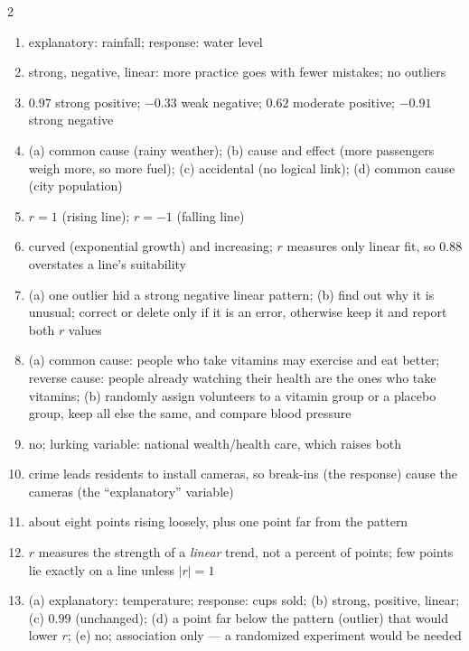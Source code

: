 \documentclass[11pt]{article}
\begin{document}
\begin{keybox}
\begin{multicols}{2}
\small
\begin{enumerate}[leftmargin=*,itemsep=3pt]
  \item explanatory: rainfall; response: water level
  \item strong, negative, linear: more practice goes with fewer mistakes; no outliers
  \item $0.97$ strong positive; $-0.33$ weak negative; $0.62$ moderate positive; $-0.91$ strong negative
  \item (a) common cause (rainy weather); (b) cause and effect (more passengers weigh more, so more fuel); (c) accidental (no logical link); (d) common cause (city population)
  \item $r=1$ (rising line); $r=-1$ (falling line)
  \item curved (exponential growth) and increasing; $r$ measures only linear fit, so $0.88$ overstates a line's suitability
  \item (a) one outlier hid a strong negative linear pattern; (b) find out why it is unusual; correct or delete only if it is an error, otherwise keep it and report both $r$ values
  \item (a) common cause: people who take vitamins may exercise and eat better; reverse cause: people already watching their health are the ones who take vitamins; (b) randomly assign volunteers to a vitamin group or a placebo group, keep all else the same, and compare blood pressure
  \item no; lurking variable: national wealth/health care, which raises both
  \item crime leads residents to install cameras, so break-ins (the response) cause the cameras (the \textquotedblleft{}explanatory\textquotedblright{} variable)
  \item about eight points rising loosely, plus one point far from the pattern
  \item $r$ measures the strength of a \emph{linear} trend, not a percent of points; few points lie exactly on a line unless $|r|=1$
  \item (a) explanatory: temperature; response: cups sold; (b) strong, positive, linear; (c) $0.99$ (unchanged); (d) a point far below the pattern (outlier) that would lower $r$; (e) no; association only --- a randomized experiment would be needed
\end{enumerate}
\end{multicols}
\end{keybox}
\end{document}
